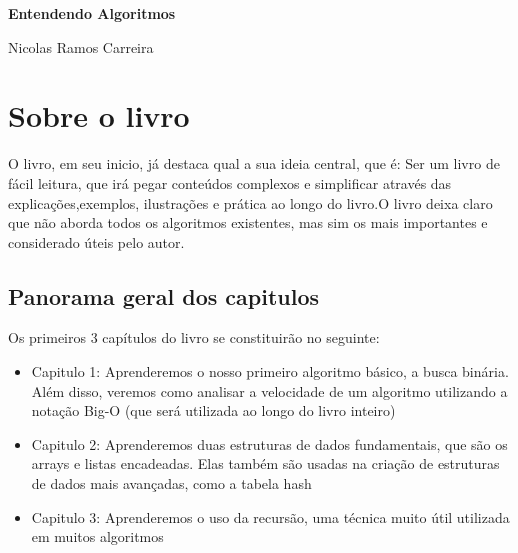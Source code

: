 \documentclass{report}
\begin{document}
	
	\begin{titlepage}
		
		\centering
		\vspace*{5cm} %
		
		{\Huge\bfseries Entendendo Algoritmos\par} %
		
		\vspace{0.5cm}
		
		
		\vfill
		{\large Nicolas Ramos Carreira\par} %
		
		\vspace*{2cm}
	\end{titlepage}
	
	\tableofcontents
	\newpage
	
	\setcounter{chapter}{-1}
	
	\chapter{Sobre o livro}
	
	O livro, em seu inicio, já destaca qual a sua ideia central, que é: Ser um livro de fácil leitura, que irá pegar conteúdos complexos e simplificar através das explicações,exemplos, ilustrações e prática ao longo do livro.O livro deixa claro que não aborda todos os algoritmos existentes, mas sim os mais importantes e considerado úteis pelo autor. 
	
	\section{Panorama geral dos capitulos}
	
	Os primeiros 3 capítulos do livro se constituirão no seguinte:
	
	\begin{itemize}
		\item Capitulo 1: Aprenderemos o nosso primeiro algoritmo básico, a busca binária. Além disso, veremos como analisar a velocidade de um algoritmo utilizando a notação Big-O (que será utilizada ao longo do livro inteiro)
		\item Capitulo 2: Aprenderemos duas estruturas de dados fundamentais, que são os arrays e listas encadeadas. Elas também são usadas na criação de estruturas de dados mais avançadas, como a tabela hash
		\item Capitulo 3: Aprenderemos o uso da recursão, uma técnica muito útil utilizada em muitos algoritmos
	\end{itemize}
	
\end{document}
